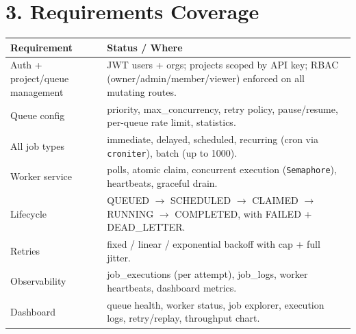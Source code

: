 \documentclass[11pt]{article}
\begin{document}
\section*{3. Requirements Coverage}
\begin{tabularx}{\textwidth}{l X}
\toprule
\textbf{Requirement} & \textbf{Status / Where} \\
\midrule
Auth + project/queue management & JWT users + orgs; projects scoped by API key; RBAC (owner/admin/member/viewer) enforced on all mutating routes. \\
Queue config & priority, max\_concurrency, retry policy, pause/resume, per-queue rate limit, statistics. \\
All job types & immediate, delayed, scheduled, recurring (cron via \texttt{croniter}), batch (up to 1000). \\
Worker service & polls, atomic claim, concurrent execution (\texttt{Semaphore}), heartbeats, graceful drain. \\
Lifecycle & QUEUED $\to$ SCHEDULED $\to$ CLAIMED $\to$ RUNNING $\to$ COMPLETED, with FAILED + DEAD\_LETTER. \\
Retries & fixed / linear / exponential backoff with cap + full jitter. \\
Observability & job\_executions (per attempt), job\_logs, worker heartbeats, dashboard metrics. \\
Dashboard & queue health, worker status, job explorer, execution logs, retry/replay, throughput chart. \\
\bottomrule
\end{tabularx}
\end{document}

